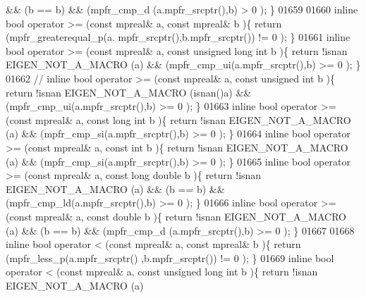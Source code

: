 \begin{DoxyCode}
       && (b == b) && (mpfr\_cmp\_d (a.mpfr\_srcptr(),b) > 0 );    \}
01659 
01660 \textcolor{keyword}{inline} \textcolor{keywordtype}{bool} operator >= (\textcolor{keyword}{const} mpreal& a, \textcolor{keyword}{const} mpreal& b           )\{  \textcolor{keywordflow}{return} (mpfr\_greaterequal\_p(a.
      mpfr\_srcptr(),b.mpfr\_srcptr()) != 0 );       \}
01661 \textcolor{keyword}{inline} \textcolor{keywordtype}{bool} operator >= (\textcolor{keyword}{const} mpreal& a, \textcolor{keyword}{const} \textcolor{keywordtype}{unsigned} \textcolor{keywordtype}{long} \textcolor{keywordtype}{int} b )\{  \textcolor{keywordflow}{return} !isnan EIGEN\_NOT\_A\_MACRO (a)
       && (mpfr\_cmp\_ui(a.mpfr\_srcptr(),b) >= 0 );                \}
01662 \textcolor{comment}{// inline bool operator >= (const mpreal& a, const unsigned int b      )\{  return !isnan EIGEN\_NOT\_A\_MACRO
       (isnan()a) && (mpfr\_cmp\_ui(a.mpfr\_srcptr(),b) >= 0 );                \}}
01663 \textcolor{keyword}{inline} \textcolor{keywordtype}{bool} operator >= (\textcolor{keyword}{const} mpreal& a, \textcolor{keyword}{const} \textcolor{keywordtype}{long} \textcolor{keywordtype}{int} b          )\{  \textcolor{keywordflow}{return} !isnan EIGEN\_NOT\_A\_MACRO (a)
       && (mpfr\_cmp\_si(a.mpfr\_srcptr(),b) >= 0 );                \}
01664 \textcolor{keyword}{inline} \textcolor{keywordtype}{bool} operator >= (\textcolor{keyword}{const} mpreal& a, \textcolor{keyword}{const} \textcolor{keywordtype}{int} b               )\{  \textcolor{keywordflow}{return} !isnan EIGEN\_NOT\_A\_MACRO (a)
       && (mpfr\_cmp\_si(a.mpfr\_srcptr(),b) >= 0 );                \}
01665 \textcolor{keyword}{inline} \textcolor{keywordtype}{bool} operator >= (\textcolor{keyword}{const} mpreal& a, \textcolor{keyword}{const} \textcolor{keywordtype}{long} \textcolor{keywordtype}{double} b       )\{  \textcolor{keywordflow}{return} !isnan EIGEN\_NOT\_A\_MACRO (a)
       && (b == b) && (mpfr\_cmp\_ld(a.mpfr\_srcptr(),b) >= 0 );   \}
01666 \textcolor{keyword}{inline} \textcolor{keywordtype}{bool} operator >= (\textcolor{keyword}{const} mpreal& a, \textcolor{keyword}{const} \textcolor{keywordtype}{double} b            )\{  \textcolor{keywordflow}{return} !isnan EIGEN\_NOT\_A\_MACRO (a)
       && (b == b) && (mpfr\_cmp\_d (a.mpfr\_srcptr(),b) >= 0 );   \}
01667 
01668 \textcolor{keyword}{inline} \textcolor{keywordtype}{bool} operator <  (\textcolor{keyword}{const} mpreal& a, \textcolor{keyword}{const} mpreal& b           )\{  \textcolor{keywordflow}{return} (mpfr\_less\_p(a.mpfr\_srcptr()
      ,b.mpfr\_srcptr()) != 0 );               \}
01669 \textcolor{keyword}{inline} \textcolor{keywordtype}{bool} operator <  (\textcolor{keyword}{const} mpreal& a, \textcolor{keyword}{const} \textcolor{keywordtype}{unsigned} \textcolor{keywordtype}{long} \textcolor{keywordtype}{int} b )\{  \textcolor{keywordflow}{return} !isnan EIGEN\_NOT\_A\_MACRO (a)

\end{DoxyCode}
